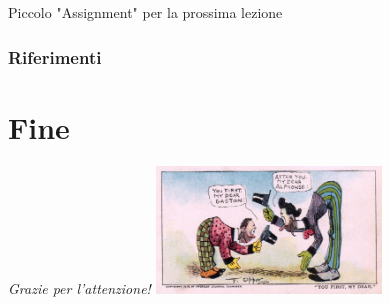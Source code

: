 \documentclass{../libs/presentation_format}
\begin{document}

\begin{frame}{Piccolo "Assignment" per la prossima lezione}
	
\end{frame}


\begin{frame}[allowframebreaks]
    \frametitle{Riferimenti}
    \printbibliography
\end{frame}

\section{Fine}
\begin{frame}{}
	\huge\emph{Grazie per l'attenzione!}
	\newline
	\vfill
	\hfill\includegraphics[width=6cm]{../libs/alphonse-gaston-regards}
\end{frame}
\end{document}
